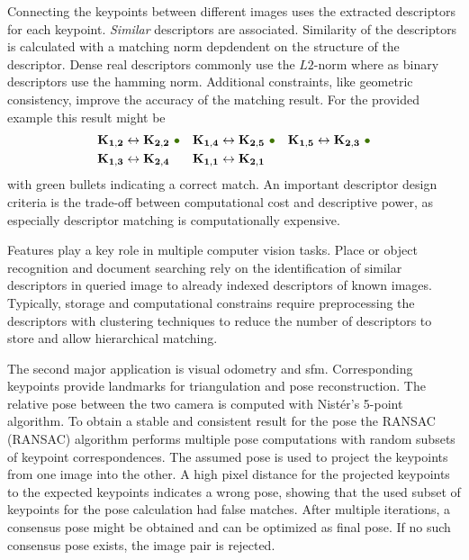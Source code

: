 Connecting the keypoints between different images uses the extracted descriptors for each keypoint.
\emph{Similar} descriptors are associated.
Similarity of the descriptors is calculated with a matching norm depdendent on the structure of the descriptor.
Dense real descriptors commonly use the $L2$-norm where as binary descriptors use the hamming norm.
Additional constraints, like geometric consistency, improve the accuracy of the matching result.
For the provided example this result might be
\begin{align*}
    \mathbf{K_{1,2}} &\leftrightarrow \mathbf{K_{2,2}}~\textcolor{darkgreen}{\bullet} &
    \mathbf{K_{1,4}} &\leftrightarrow \mathbf{K_{2,5}}~\textcolor{darkgreen}{\bullet} &
    \mathbf{K_{1,5}} &\leftrightarrow \mathbf{K_{2,3}}~\textcolor{darkgreen}{\bullet} \\
    \mathbf{K_{1,3}} &\leftrightarrow \mathbf{K_{2,4}} &
    \mathbf{K_{1,1}} &\leftrightarrow \mathbf{K_{2,1}} &
\end{align*}
with green bullets indicating a correct match.
An important descriptor design criteria is the trade-off between computational cost and descriptive power, as especially descriptor matching is computationally expensive.

Features play a key role in multiple computer vision tasks.
Place or object recognition and document searching rely on the identification of similar descriptors in queried image to already indexed descriptors of known images.
Typically, storage and computational constrains require preprocessing the descriptors with clustering techniques to reduce the number of descriptors to store and allow hierarchical matching.

The second major application is visual odometry and \gls{sfm}.
Corresponding keypoints provide landmarks for triangulation and pose reconstruction.
The relative pose between the two camera is computed with Nistér's 5-point algorithm\cite{nister_ieee2004}.
To obtain a stable and consistent result for the pose the \acrshort{RANSAC} (\acrlong{RANSAC})\cite{fischler_ransac_1980} algorithm performs multiple pose computations with random subsets of keypoint correspondences.
The assumed pose is used to project the keypoints from one image into the other.
A high pixel distance for the projected keypoints to the expected keypoints indicates a wrong pose, showing that the used subset of keypoints for the pose calculation had false matches.
After multiple iterations, a consensus pose might be obtained and can be optimized as final pose.
If no such consensus pose exists, the image pair is rejected.

